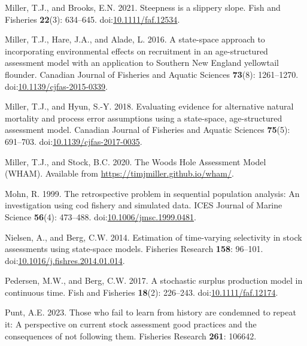 \documentclass[
  12pt,
]{article}
\newlength{\cslhangindent}
\newlength{\cslentryspacingunit} %
\newenvironment{CSLReferences}[2] %
 {%
  \setlength{\parindent}{0pt}
  \ifodd #1
  \let\oldpar\par
  \def\par{\hangindent=\cslhangindent\oldpar}
  \fi
  \setlength{\parskip}{#2\cslentryspacingunit}
 }%
 {}
\begin{document}
\begin{CSLReferences}{1}{0}
\leavevmode{}%
Miller, T.J., and Brooks, E.N. 2021. Steepness is a slippery slope. Fish
and Fisheries \textbf{22}(3): 634--645.
doi:\href{https://doi.org/10.1111/faf.12534}{10.1111/faf.12534}.

\leavevmode{}%
Miller, T.J., Hare, J.A., and Alade, L. 2016. A state-space approach to
incorporating environmental effects on recruitment in an age-structured
assessment model with an application to {S}outhern {N}ew {E}ngland
yellowtail flounder. Canadian Journal of Fisheries and Aquatic Sciences
\textbf{73}(8): 1261--1270.
doi:\href{https://doi.org/10.1139/cjfas-2015-0339}{10.1139/cjfas-2015-0339}.

\leavevmode{}%
Miller, T.J., and Hyun, S.-Y. 2018. Evaluating evidence for alternative
natural mortality and process error assumptions using a state-space,
age-structured assessment model. Canadian Journal of Fisheries and
Aquatic Sciences \textbf{75}(5): 691--703.
doi:\href{https://doi.org/10.1139/cjfas-2017-0035}{10.1139/cjfas-2017-0035}.

\leavevmode{}%
Miller, T.J., and Stock, B.C. 2020. The {Woods Hole Assessment Model}
({WHAM}). Available from \url{https://timjmiller.github.io/wham/}.

\leavevmode{}%
Mohn, R. 1999. The retrospective problem in sequential population
analysis: An investigation using cod fishery and simulated data. ICES
Journal of Marine Science \textbf{56}(4): 473--488.
doi:\href{https://doi.org/10.1006/jmsc.1999.0481}{10.1006/jmsc.1999.0481}.

\leavevmode{}%
Nielsen, A., and Berg, C.W. 2014. Estimation of time-varying selectivity
in stock assessments using state-space models. Fisheries Research
\textbf{158}: 96--101.
doi:\href{https://doi.org/10.1016/j.fishres.2014.01.014}{10.1016/j.fishres.2014.01.014}.

\leavevmode{}%
Pedersen, M.W., and Berg, C.W. 2017. A stochastic surplus production
model in continuous time. Fish and Fisheries \textbf{18}(2): 226--243.
doi:\href{https://doi.org/10.1111/faf.12174}{10.1111/faf.12174}.

\leavevmode{}%
Punt, A.E. 2023. Those who fail to learn from history are condemned to
repeat it: A perspective on current stock assessment good practices and
the consequences of not following them. Fisheries Research \textbf{261}:
106642.


\end{CSLReferences}
\end{document}
